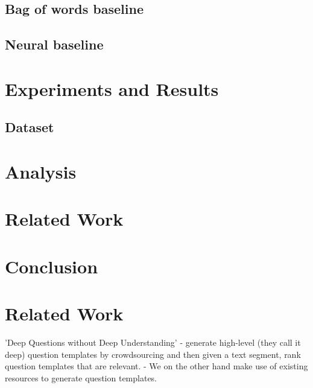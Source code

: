 \documentclass[11pt]{article}
\begin{document}
\subsection{Bag of words baseline}

\subsection{Neural baseline}

\section{Experiments and Results}\label{experiments_results}

\subsection{Dataset}\label{dataset}

\section{Analysis}

\section{Related Work} \label{related_work}

\section{Conclusion}


\iffalse

\section{Related Work} \label{related_work}

'Deep Questions without Deep Understanding' 
- generate high-level (they call it deep) question templates by crowdsourcing and then given a text segment, rank question templates that are relevant. 
- We on the other hand make use of existing resources to generate question templates. 
\end{document}
